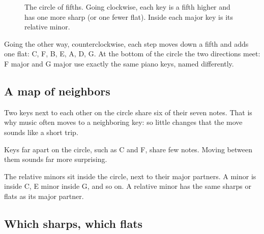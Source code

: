 \begin{figure}[htbp]
\centering
{}
\caption{The circle of fifths. Going clockwise, each key is a fifth higher and has one more sharp (or one fewer flat). Inside each major key is its relative minor.}
\label{fig:circle-of-fifths}
\end{figure}

Going the other way, counterclockwise, each step moves down a fifth and adds one flat: C, F, B\fl, E\fl, A\fl, D\fl, G\fl. At the bottom of the circle the two directions meet: F\sh{} major and G\fl{} major use exactly the same piano keys, named differently.

\subsection*{A map of neighbors}

Two keys next to each other on the circle share six of their seven notes. That is why music often moves to a neighboring key: so little changes that the move sounds like a short trip.

Keys far apart on the circle, such as C and F\sh, share few notes. Moving between them sounds far more surprising.

The relative minors sit inside the circle, next to their major partners. A minor is inside C, E minor inside G, and so on. A relative minor has the same sharps or flats as its major partner.

\subsection*{Which sharps, which flats}

